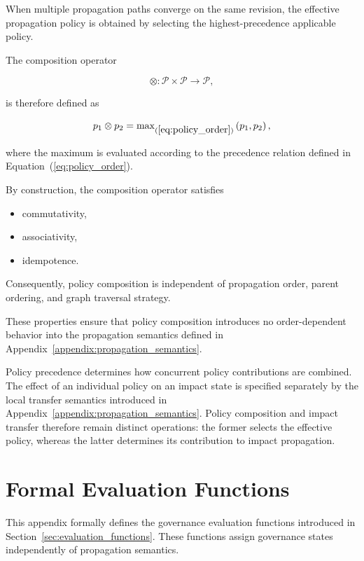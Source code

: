 \documentclass[10pt]{article}
\begin{document}
When multiple propagation paths converge on the same revision, the effective
propagation policy is obtained by selecting the highest-precedence applicable
policy.

The composition operator

\begin{equation}
	\otimes :
	\mathcal{P}\times\mathcal{P}
	\rightarrow
	\mathcal{P},
	\label{eq:policy_composition}
\end{equation}

is therefore defined as

\begin{equation}
	p_1\otimes p_2
	=
	\max\nolimits_{(\ref{eq:policy_order})}
	\left(p_1,p_2\right),
	\label{eq:policy_max}
\end{equation}

where the maximum is evaluated according to the precedence relation defined in Equation~(\ref{eq:policy_order}).

By construction, the composition operator satisfies

\begin{itemize}
	\item commutativity,
	\item associativity,
	\item idempotence.
\end{itemize}

Consequently, policy composition is independent of propagation order, parent ordering, and graph traversal strategy.

These properties ensure that policy composition introduces no order-dependent behavior into the propagation semantics defined in Appendix~\ref{appendix:propagation_semantics}.

Policy precedence determines how concurrent policy contributions are combined.
The effect of an individual policy on an impact state is specified separately
by the local transfer semantics introduced in
Appendix~\ref{appendix:propagation_semantics}. Policy composition and impact
transfer therefore remain distinct operations: the former selects the effective
policy, whereas the latter determines its contribution to impact propagation.

\section{Formal Evaluation Functions}
\label{appendix:evaluation_functions}

This appendix formally defines the governance evaluation functions introduced in Section~\ref{sec:evaluation_functions}. These functions assign governance states independently of propagation semantics.
\end{document}
